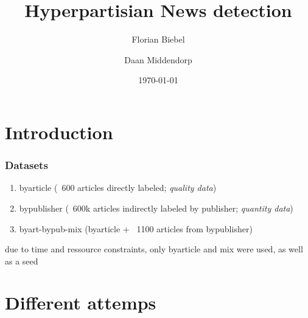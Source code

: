 \documentclass{beamer}
\begin{document}
\title{Hyperpartisian News detection}   
\author{Florian Biebel \and Daan Middendorp} 
\date{\today} 

\frame{\titlepage} 




\section{Introduction}


\begin{frame}
    \frametitle{Datasets}
    \begin{enumerate}
        \item byarticle (~600 articles directly labeled; \emph{quality data})
        \item bypublisher (~600k articles indirectly labeled by publisher; \emph{quantity data})
        \item byart-bypub-mix (byarticle + ~1100 articles from bypublisher)
    \end{enumerate}
    due to time and ressource constraints, only byarticle and mix were used, as well as a seed
\end{frame}

\section{Different attemps}
\end{document}
